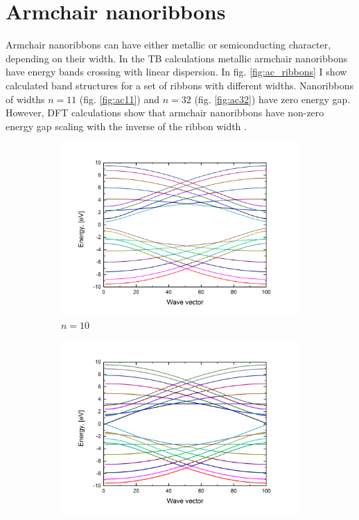 \section{Armchair nanoribbons}
Armchair nanoribbons can have either metallic or semiconducting character, depending on their width. In the TB calculations metallic armchair nanoribbons have energy bands crossing with linear dispersion. In fig. \ref{fig:ac_ribbons}
I show calculated band structures for a set of ribbons with different widths. Nanoribbons of widths $n= 11$ (fig. \ref{fig:ac11}) and $n=32$ (fig. \ref{fig:ac32}) have zero energy gap. However, DFT calculations show that armchair nanoribbons have non-zero energy gap scaling with the inverse of the ribbon width \cite{han}.
\begin{figure}[hb!]
\centering
\begin{subfigure}{.5\textwidth}
  \centering
  \includegraphics[width=\linewidth]{img/ac_ribbon_10}
  \caption{$n=10$}
  \label{fig:ac10}
\end{subfigure}%
\begin{subfigure}{.5\textwidth}
  \centering
  \includegraphics[width=\linewidth]{img/ac_ribbon_11}

\end{subfigure}
\end{figure}
